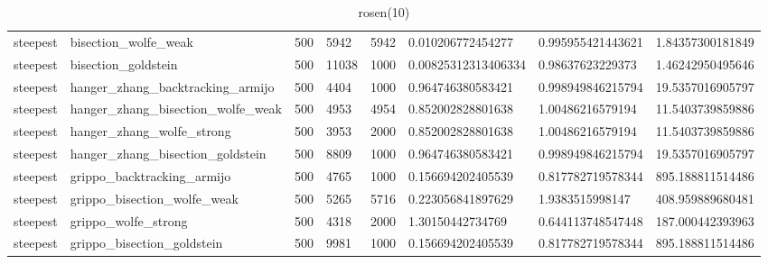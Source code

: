 \documentclass[a4paper,11pt]{article}
\numberwithin{equation}{section} %
\begin{document}
\begin{table}[h!]
{\begin{tabular}{|l|l|l|l|l|l|l|l|}
        steepest & bisection\_wolfe\_weak & 500 & 5942 & 5942 & 0.010206772454277 & 0.995955421443621 & 1.84357300181849 \\
        steepest & bisection\_goldstein & 500 & 11038 & 1000 & 0.00825312313406334 & 0.98637623229373 & 1.46242950495646 \\
        steepest & hanger\_zhang\_backtracking\_armijo & 500 & 4404 & 1000 & 0.964746380583421 & 0.998949846215794 & 19.5357016905797 \\
        steepest & hanger\_zhang\_bisection\_wolfe\_weak & 500 & 4953 & 4954 & 0.852002828801638 & 1.00486216579194 & 11.5403739859886 \\
        steepest & hanger\_zhang\_wolfe\_strong & 500 & 3953 & 2000 & 0.852002828801638 & 1.00486216579194 & 11.5403739859886 \\
        steepest & hanger\_zhang\_bisection\_goldstein & 500 & 8809 & 1000 & 0.964746380583421 & 0.998949846215794 & 19.5357016905797 \\
        steepest & grippo\_backtracking\_armijo & 500 & 4765 & 1000 & 0.156694202405539 & 0.817782719578344 & 895.188811514486 \\
        steepest & grippo\_bisection\_wolfe\_weak & 500 & 5265 & 5716 & 0.223056841897629 & 1.9383515998147 & 408.959889680481 \\
        steepest & grippo\_wolfe\_strong & 500 & 4318 & 2000 & 1.30150442734769 & 0.644113748547448 & 187.000442393963 \\
        steepest & grippo\_bisection\_goldstein & 500 & 9981 & 1000 & 0.156694202405539 & 0.817782719578344 & 895.188811514486 \\
\end{tabular}}
\caption{rosen(10)}
\label{table:rosen(10)}
\end{table}
\end{document}
